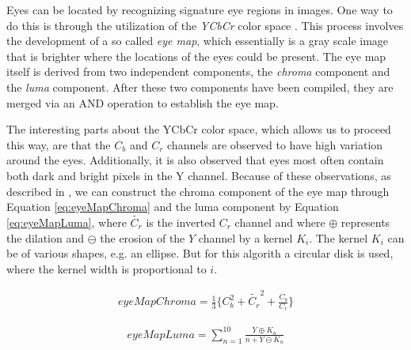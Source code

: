 Eyes can be located by recognizing signature eye regions in images. One way to do this is through the utilization of the \textit{YCbCr} color space \cite{fdInColorImages}. This process involves the development of a so called \textit{eye map}, which essentially is a gray scale image that is brighter where the locations of the eyes could be present. The eye map itself is derived from two independent components, the \textit{chroma} component and the \textit{luma} component. After these two components have been compiled, they are merged via an AND operation to establish the eye map. 

The interesting parts about the YCbCr color space, which allows us to proceed this way, are that the $C_{b}$ and $C_{r}$ channels are observed to have high variation around the eyes. Additionally, it is also observed that eyes most often contain both dark and bright pixels in the Y channel. Because of these observations, as described in \cite{fdInColorImages}, we can construct  the chroma component of the eye map through Equation \ref{eq:eyeMapChroma} and the luma component by Equation \ref{eq:eyeMapLuma}, where $\tilde{C_r}$ is the inverted $C_r$ channel and where $\oplus$ represents the dilation and $\ominus$ the erosion of the $Y$ channel by a kernel $K_{i}$. The kernel $K_{i}$ can be of various shapes, e.g. an ellipse. But for this algorith a circular disk is used, where the kernel width is proportional to $i$.

\begin{equation} \label{eq:eyeMapChroma}
\begin{split}
eyeMapChroma = \frac{1}{3} \lbrace C_b^2 + \tilde{C_r}^2 + \frac{C_b}{C_r} \rbrace
\end{split}
\end{equation}


\begin{equation} \label{eq:eyeMapLuma}
\begin{split}
  eyeMapLuma = \sum_{n=1}^{10}\frac{Y\oplus K_{n}}{n + Y\ominus  K_{n}}
\end{split}
\end{equation}






